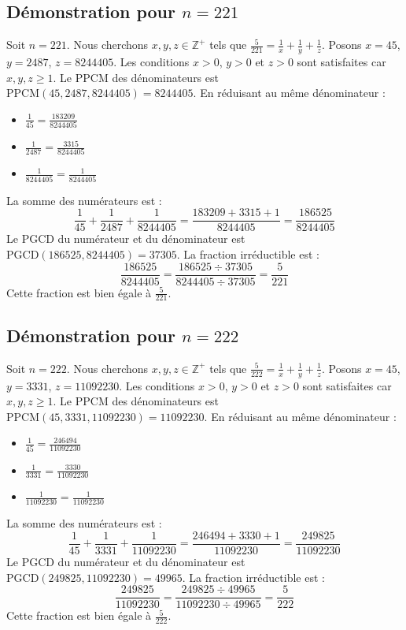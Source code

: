 \documentclass[11pt,a4paper]{article}
\begin{document}
\subsection{Démonstration pour $n = 221$}
Soit $n = 221$. Nous cherchons $x, y, z \in \mathbb{Z}^{+}$ tels que $\frac{5}{221} = \frac{1}{x} + \frac{1}{y} + \frac{1}{z}$.
Posons $x = 45$, $y = 2487$, $z = 8244405$.
Les conditions $x > 0$, $y > 0$ et $z > 0$ sont satisfaites car $x, y, z \geq 1$.
Le PPCM des dénominateurs est $\text{PPCM}(45, 2487, 8244405) = 8244405$.
En réduisant au même dénominateur :
\begin{itemize}
    \item $\frac{1}{45} = \frac{183209}{8244405}$
    \item $\frac{1}{2487} = \frac{3315}{8244405}$
    \item $\frac{1}{8244405} = \frac{1}{8244405}$
\end{itemize}
La somme des numérateurs est :
$$ \frac{1}{45} + \frac{1}{2487} + \frac{1}{8244405} = \frac{183209 + 3315 + 1}{8244405} = \frac{186525}{8244405} $$
Le PGCD du numérateur et du dénominateur est $\text{PGCD}(186525, 8244405) = 37305$.
La fraction irréductible est :
$$ \frac{186525}{8244405} = \frac{186525 \div 37305}{8244405 \div 37305} = \frac{5}{221} $$
Cette fraction est bien égale à $\frac{5}{221}$.

\subsection{Démonstration pour $n = 222$}
Soit $n = 222$. Nous cherchons $x, y, z \in \mathbb{Z}^{+}$ tels que $\frac{5}{222} = \frac{1}{x} + \frac{1}{y} + \frac{1}{z}$.
Posons $x = 45$, $y = 3331$, $z = 11092230$.
Les conditions $x > 0$, $y > 0$ et $z > 0$ sont satisfaites car $x, y, z \geq 1$.
Le PPCM des dénominateurs est $\text{PPCM}(45, 3331, 11092230) = 11092230$.
En réduisant au même dénominateur :
\begin{itemize}
    \item $\frac{1}{45} = \frac{246494}{11092230}$
    \item $\frac{1}{3331} = \frac{3330}{11092230}$
    \item $\frac{1}{11092230} = \frac{1}{11092230}$
\end{itemize}
La somme des numérateurs est :
$$ \frac{1}{45} + \frac{1}{3331} + \frac{1}{11092230} = \frac{246494 + 3330 + 1}{11092230} = \frac{249825}{11092230} $$
Le PGCD du numérateur et du dénominateur est $\text{PGCD}(249825, 11092230) = 49965$.
La fraction irréductible est :
$$ \frac{249825}{11092230} = \frac{249825 \div 49965}{11092230 \div 49965} = \frac{5}{222} $$
Cette fraction est bien égale à $\frac{5}{222}$.
\end{document}
